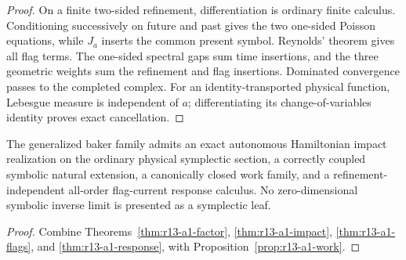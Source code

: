 \begin{proof}
On a finite two-sided refinement, differentiation is ordinary finite
calculus.  Conditioning successively on future and past gives the two
one-sided Poisson equations, while $J_a$ inserts the common present symbol.
Reynolds' theorem gives all flag terms.  The one-sided spectral gaps sum time
insertions, and the three geometric weights sum the refinement and flag
insertions.  Dominated convergence passes to the completed complex.  For an
identity-transported physical function, Lebesgue measure is independent of
$a$; differentiating its change-of-variables identity proves exact
cancellation.
\end{proof}

\begin{theorem}
\label{thm:r13-a1-main}
The generalized baker family admits an exact autonomous Hamiltonian impact
realization on the ordinary physical symplectic section, a correctly coupled
symbolic natural extension, a canonically closed work family, and a
refinement-independent all-order flag-current response calculus.  No
zero-dimensional symbolic inverse limit is presented as a symplectic leaf.
\end{theorem}

\begin{proof}
Combine Theorems~\ref{thm:r13-a1-factor},
\ref{thm:r13-a1-impact}, \ref{thm:r13-a1-flags}, and
\ref{thm:r13-a1-response}, with Proposition~\ref{prop:r13-a1-work}.
\end{proof}
